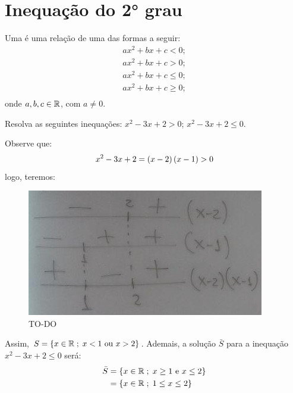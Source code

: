 \section{Inequação do 2° grau}

\begin{definition}
Uma  é uma relação de uma das formas
a seguir:
%
\begin{gather*}
ax^2 +bx + c <0;\\
ax^2 +bx + c>0;\\
ax^2 +bx + c \le 0;\\
ax^2 +bx + c \ge 0;\\
\end{gather*}
%
onde $a, b, c \in \mathbb{R}$, com $ a \ne 0$.
\end{definition}

\begin{example}
Resolva as seguintes inequações: $x^2 -3x +2 > 0$; $x^2 -3x +2 \le 0$.
\end{example}

\begin{solution}
Observe que: 
%
\begin{align*}
x^2-3x+2=\left(x-2\right)\left(x-1\right)>0
\end{align*}
%
\noindent logo, teremos:

\begin{figure}[H]
\caption{TO-DO}
\includegraphics{../../res/img/[ok]photo_2018-08-24_22-55-35.jpg}
\centering
\end{figure}

Assim, $S = \left\{ x \in \mathbb{R} \;;\;{x<1 \text{ ou } x>2}\right\}$. Ademais, a solução $\bar{S}$ para a inequação $x^2-3x+2\le0$ será:
%
\begin{align*}
\bar{S} &= \left\{ x \in \mathbb{R} \;;\; x \ge 1 \text{ e } x \le 2\right\} \\
		&= \left\{ x \in \mathbb{R} \;;\; 1 \le x \le 2\right\} 
\end{align*}
\end{solution}

